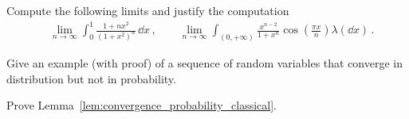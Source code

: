 \begin{problem}
	Compute the following limits and justify the computation
	\begin{align*}
		& \lim_{n\to\infty} \int_0^1 \frac{1 + n x^2}{(1 + x^2)^n}\,\dd x\,,\qquad\lim_{n\to\infty} \int_{(0,+\infty)} \frac{x^{n-2}}{1+ x^n}\cos\left(\frac{\pi x}{n}\right) \lambda(\dd x) \,.
	\end{align*}
\end{problem}



\begin{problem}\label{prb:dlim_not_plim}
Give an example (with proof) of a sequence of random variables that converge in distribution but not in probability.
\end{problem}

\begin{problem}\label{prb:convergence_probability_classic}
Prove Lemma~\ref{lem:convergence_probability_classical}.
\end{problem}

